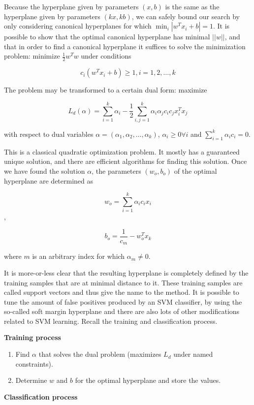 \documentclass[12pt]{report}
\begin{document}
Because the hyperplane given by parameters $(x, b)$ is the same as the hyperplane given by parameters $(kx, kb)$, we can safely bound our search by only considering canonical hyperplanes for which $\min_i |w^T x_i + b| = 1$. It is possible to show that the optimal canonical hyperplane has minimal $||w||$, and that in order to find a canonical hyperplane it suffices to solve the minimization problem: minimize $\frac{1}{2} w^T w$ under conditions

$$c_i(w^T x_i + b) \ge 1, i = 1, 2, \dots, k$$

The problem may be transformed to a certain dual form: maximize

$$L_d(\alpha) = \sum_{i = 1}^{k} \alpha_i - \frac{1}{2} \sum_{i, j = 1}^{k} \alpha_i \alpha_j c_i c_j x_i^T x_j$$

with respect to dual variables $\alpha = (\alpha_1, \alpha_2, \dots, \alpha_k)$, $\alpha_i \ge 0 \forall i$ and $\sum_{i = 1}^{k} \alpha_i c_i = 0$.

This is a classical quadratic optimization problem. It mostly has a guaranteed unique solution, and there are efficient algorithms for finding this solution. Once we have found the solution $\alpha$, the parameters $(w_o, b_o)$ of the optimal hyperplane are determined as

$$w_o = \sum_{i = 1}^{k} \alpha_i c_i x_i$$,

$$b_o = \frac{1}{c_m} - w_o^T x_k$$

where $m$ is an arbitrary index for which $\alpha_m \ne 0$.

It is more-or-less clear that the resulting hyperplane is completely defined by the training samples that are at minimal distance to it. These training samples are called support vectors and thus give the name to the method. It is possible to tune the amount of false positives produced by an SVM classifier, by using the so-called soft margin hyperplane and there are also lots of other modifications related to SVM learning. Recall the training and classification process.

\textbf{Training process}

\begin{enumerate}
	\item Find $\alpha$ that solves the dual problem (maximizes $L_d$ under named
	constraints).
	\item Determine $w$ and $b$ for the optimal hyperplane and store the values.
\end{enumerate}

\textbf{Classification process}
\end{document}
